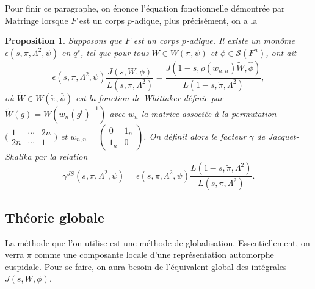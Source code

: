 \documentclass{amsart}
\newtheorem{proposition}{Proposition}[section]
\begin{document}
  Pour finir ce paragraphe, on énonce l'équation fonctionnelle démontrée par Matringe lorsque $F$ est un corps $p$-adique, plus précisément, on a la
 \begin{proposition}
 \label{funcloc}
 Supposons que $F$ est un corps $p$-adique. Il existe un monôme $\epsilon(s,\pi,\Lambda^2,\psi)$ en $q^s$, tel que pour tous $W \in W(\pi,\psi)$ et $\phi \in \mathcal{S}(F^n)$, ont ait
 \begin{equation}
 \epsilon(s, \pi, \Lambda^2, \psi) \frac{J(s,W,\phi)}{L(s,\pi,\Lambda^2)}  = \frac{J(1-s,\rho(w_{n,n})\tilde{W},\hat{\phi})}{L(1-s,\tilde{\pi},\Lambda^2)},
 \end{equation}
 où $\tilde{W} \in W(\tilde{\pi}, \bar{\psi})$ est la fonction de Whittaker définie par $\tilde{W}(g) = W(w_n(g^t)^{-1})$ avec $w_n$ la matrice associée à la permutation $\bigl(\begin{smallmatrix}
    1 & \cdots & 2n  \\
    2n & \cdots &  1 
  \end{smallmatrix}\bigr)$
  et
 $w_{n,n} = \begin{pmatrix}
0 & 1_n \\
1_n & 0
\end{pmatrix}$. On définit alors le facteur $\gamma$ de Jacquet-Shalika par la relation
\begin{equation}
\gamma^{JS}(s,\pi,\Lambda^2,\psi)  = \epsilon(s,\pi,\Lambda^2,\psi)\frac{L(1-s,\tilde{\pi},\Lambda^2)}{L(s,\pi,\Lambda^2)}.
\end{equation}
 \end{proposition}
 
  \subsection{Théorie globale}
  La méthode que l'on utilise est une méthode de globalisation. Essentiellement, on verra $\pi$ comme une composante locale d'une représentation automorphe cuspidale. Pour se faire, on aura besoin de l'équivalent global des intégrales $J(s, W, \phi)$.
  
\end{document}
